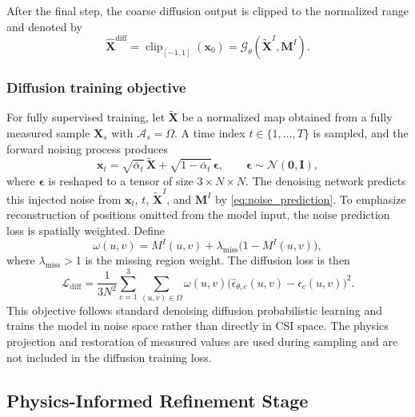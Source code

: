 \documentclass[lettersize,journal]{IEEEtran}
\newcommand{\vect}[1]{\boldsymbol{#1}}
\newcommand{\mat}[1]{\mathbf{#1}}
\begin{document}
After the final step, the coarse diffusion output is clipped to the normalized range and denoted by
\begin{equation}
    \widehat{\mat{X}}^{\mathrm{diff}}
    =\operatorname{clip}_{[-1,1]}(\mat{x}_0)
    =\mathcal{G}_{\theta}(\widetilde{\mat{X}}^{I},\mat{M}^{I}).
    \label{eq:coarse_output}
\end{equation}

\subsubsection{Diffusion training objective}

For fully supervised training, let $\widetilde{\mat{X}}$ be a normalized map obtained from a fully measured sample $\mat{X}_s$ with $\mathcal{A}_s=\Omega$. A time index $t\in\{1,\ldots,T\}$ is sampled, and the forward noising process produces
\begin{equation}
    \mat{x}_t=\sqrt{\bar{\alpha}_t}\,\widetilde{\mat{X}}+\sqrt{1-\bar{\alpha}_t}\,\vect{\epsilon},
    \qquad
    \vect{\epsilon}\sim\mathcal{N}(\mat{0},\mat{I}),
    \label{eq:forward_diffusion}
\end{equation}
where $\vect{\epsilon}$ is reshaped to a tensor of size $3\times N\times N$. The denoising network predicts this injected noise from $\mat{x}_t$, $t$, $\widetilde{\mat{X}}^{I}$, and $\mat{M}^{I}$ by \eqref{eq:noise_prediction}. To emphasize reconstruction of positions omitted from the model input, the noise prediction loss is spatially weighted. Define
\begin{equation}
    \omega(u,v)=M^{I}(u,v)+\lambda_{\mathrm{miss}}\big(1-M^{I}(u,v)\big),
    \label{eq:weight_function}
\end{equation}
where $\lambda_{\mathrm{miss}}>1$ is the missing region weight. The diffusion loss is then
\begin{equation}
    \mathcal{L}_{\mathrm{diff}}=
    \frac{1}{3N^2}
    \sum_{c=1}^{3}\sum_{(u,v)\in\Omega}
    \omega(u,v)\big(\widehat{\epsilon}_{\theta,c}(u,v)-\epsilon_c(u,v)\big)^2.
    \label{eq:diffusion_loss}
\end{equation}
This objective follows standard denoising diffusion probabilistic learning and trains the model in noise space rather than directly in CSI space. The physics projection and restoration of measured values are used during sampling and are not included in the diffusion training loss.

\subsection{Physics-Informed Refinement Stage}
\end{document}
